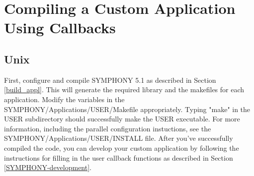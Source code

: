 




\section{Compiling a Custom Application Using Callbacks}

\subsection{Unix}

First, configure and compile SYMPHONY 5.1 as described in
Section \ref{build_appl}. This will generate the required library
and the makefiles for each application. Modify the variables in the 
SYMPHONY/Applications/USER/Makefile appropriately. 
Typing "make" in the USER subdirectory should successfully make
the USER executable. For more information, including the parallel 
configuration instuctions, see the 
SYMPHONY/Applications/USER/INSTALL file. 
After you've successfully compiled the code, you can develop your custom 
application by following the
instructions for filling in the user callback functions as described in
Section \ref{SYMPHONY-development}.

